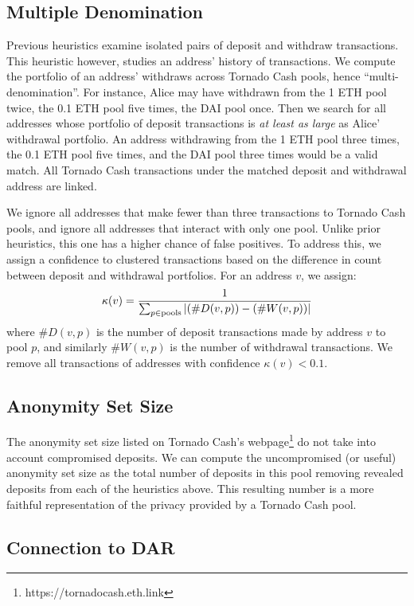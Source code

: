 \documentclass[11pt,a4paper]{article}
\begin{document}
\subsection{Multiple Denomination}

Previous heuristics examine isolated pairs of deposit and withdraw transactions. This heuristic however, studies an address' history of transactions. We compute the portfolio of an address' withdraws across Tornado Cash pools, hence ``multi-denomination''. For instance, Alice may have withdrawn from the 1 ETH pool twice, the 0.1 ETH pool five times, the DAI pool once. Then we search for all addresses whose portfolio of deposit transactions is \textit{at least as large} as Alice' withdrawal portfolio. An address withdrawing from the 1 ETH pool three times, the 0.1 ETH pool five times, and the DAI pool three times would be a valid match. All Tornado Cash transactions under the matched deposit and withdrawal address are linked.

We ignore all addresses that make fewer than three transactions to Tornado Cash pools, and ignore all addresses that interact with only one pool. Unlike prior heuristics, this one has a higher chance of false positives. To address this, we assign a confidence to clustered transactions based on the difference in count between deposit and withdrawal portfolios. For an address $v$, we assign:
\begin{equation*}
  \kappa(v) = \frac{1}{\sum_{p \in \textup{pools}} |(\#D(v,p)) - (\#W(v,p))| }
\end{equation*}
where $\#D(v,p)$ is the number of deposit transactions made by address $v$ to pool $p$, and similarly $\#W(v, p)$ is the number of withdrawal transactions. We remove all transactions of addresses with confidence $\kappa(v) < 0.1$.

\subsection{Anonymity Set Size}

The anonymity set size listed on Tornado Cash's webpage\footnote{https://tornadocash.eth.link} do not take into account compromised deposits. We can compute the uncompromised (or useful) anonymity set size as the total number of deposits in this pool removing revealed deposits from each of the heuristics above. This resulting number is a more faithful representation of the privacy provided by a Tornado Cash pool.

\subsection{Connection to DAR}
\end{document}
